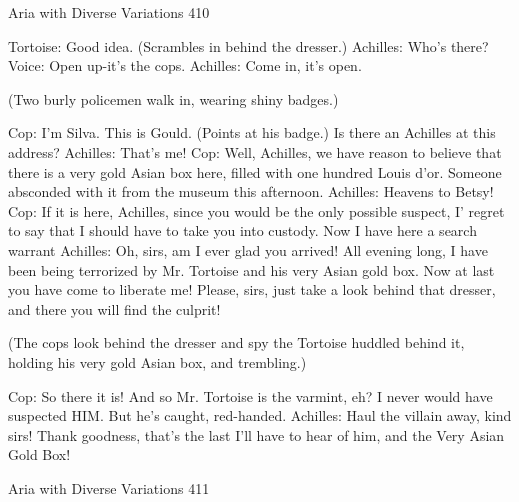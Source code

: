 Aria with Diverse Variations                                                          410

Tortoise: Good idea. (Scrambles in behind the dresser.) Achilles: Who's there?
Voice: Open up-it's the cops.
Achilles: Come in, it's open.

    (Two burly policemen walk in, wearing shiny badges.)

Cop: I'm Silva. This is Gould. (Points at his badge.) Is there an Achilles at this address?
Achilles: That's me!
Cop: Well, Achilles, we have reason to believe that there is a very gold Asian box here,
    filled with one hundred Louis d'or. Someone absconded with it from the museum
    this afternoon. Achilles: Heavens to Betsy!
Cop: If it is here, Achilles, since you would be the only possible suspect, I' regret to say
    that I should have to take you into custody. Now I have here a search warrant
Achilles: Oh, sirs, am I ever glad you arrived! All evening long, I have been being
    terrorized by Mr. Tortoise and his very Asian gold box. Now at last you have come
    to liberate me! Please, sirs, just take a look behind that dresser, and there you will
    find the culprit!

    (The cops look behind the dresser and spy the Tortoise huddled behind it, holding
    his very gold Asian box, and trembling.)

Cop: So there it is! And so Mr. Tortoise is the varmint, eh? I never would have suspected
    HIM. But he's caught, red-handed.
Achilles: Haul the villain away, kind sirs! Thank goodness, that's the last I'll have to hear
    of him, and the Very Asian Gold Box!




Aria with Diverse Variations                                                             411


